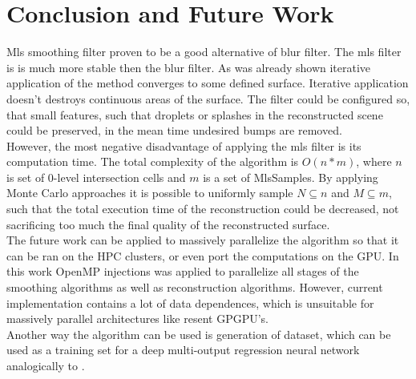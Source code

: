 \section{Conclusion and Future Work}
Mls smoothing filter proven to be a good alternative of blur filter. The mls filter is is much more stable then the blur filter. As was already shown iterative application of the method converges to some defined surface. Iterative application doesn't destroys continuous areas of the surface. The filter could be configured so, that small features, such that droplets or splashes in the reconstructed scene could be preserved, in the mean time undesired bumps are removed.\\
However, the most negative disadvantage of applying the mls filter is its computation time. The total complexity of the algorithm  is $O(n*m)$, where $n$ is set of 0-level intersection cells and $m$ is a set of MlsSamples. By applying Monte Carlo approaches it is possible to uniformly sample $N \subseteq n$ and $M \subseteq m$, such that the total execution time of the reconstruction could be decreased, not sacrificing too much the final quality of the reconstructed surface.\\
The future work can be applied to massively parallelize the algorithm so that it can be ran on the HPC clusters, or even port the computations on the GPU. In this work OpenMP injections was applied to parallelize all stages of the smoothing algorithms as well as reconstruction algorithms. However, current implementation contains a lot of data dependences, which is unsuitable for massively parallel architectures like resent GPGPU's.\\ Another way the algorithm can be used is generation of dataset, which can be used as a training set for a deep multi-output regression neural network analogically to \cite{DNNNoiseFilter}.